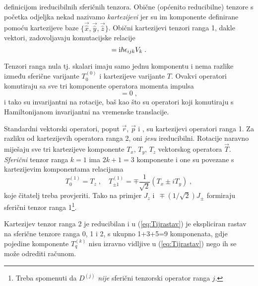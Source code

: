 definicijom ireducibilnih sferičnih tenzora. 
Obične (općenito reducibilne) tenzore s početka odjeljka nekad
nazivamo \emph{kartezijevi} jer su im komponente definirane pomoću kartezijeve
baze $\{\vec{\hat{x}}, \vec{\hat{y}}, \vec{\hat{z}}\}$.
Obični kartezijevi tenzori ranga 1, dakle vektori, zadovoljavaju komutacijske
relacije
\begin{equation}
 [J_i, V_j] = \rmi \hbar \epsilon_{ijk} V_k \;.
 \label{eq:jvkomutacija}
\end{equation}
\begin{primjer}
Tenzori ranga nula tj. skalari imaju samo jednu komponentu
i nema razlike između sferične varijante $T^{(0)}_0$ i kartezijeve varijante $T$.
Ovakvi operatori komutiraju sa sve tri komponente operatora momenta impulsa
\begin{equation}
    [J_i, T] = 0 \;,
\end{equation}
i tako su invarijantni na rotacije, baš kao što su operatori
koji komutiraju s Hamiltonijanom invarijantni na vremenske translacije.
\end{primjer}
\begin{primjer}
    Standardni vektorski operatori, poput $\vec{r}$, $\vec{p}$ i
    , su kartezijevi operatori ranga 1. Za razliku od
    kartezijevih operatora ranga 2, oni \emph{jesu} ireducibilni.
    Rotacije naravno miješaju sve tri kartezijeve komponente
    $T_x$, $T_y$, $T_z$ vektorskog operatora $\vec{T}$. 
    \emph{Sferični} tenzor ranga $k=1$ ima $2k+1=3$ komponente i
    one su povezane s kartezijevim komponentama relacijama
    \begin{equation}
    T^{(1)}_0 = T_z \;, \quad T^{(1)}_{\pm 1} = \mp \frac{1}{\sqrt{2}}
    (T_x \pm i T_y) \;,
    \label{eq:kartvektor}
    \end{equation}
    koje čitatelj treba provjeriti.
    Tako na primjer $J_z$ i $\,\mp (1/\sqrt{2})J_\pm$ formiraju sferični tenzor 
    ranga 1\footnote{Treba spomenuti da $D^{(j)}$ \emph{nije} 
    sferični tenzorski operator ranga $j$.}.
\end{primjer}
\begin{primjer}
    Kartezijev tenzor ranga 2 je reducibilan i u (\ref{eq:Tijrastav}) je ekspliciran
    rastav na sferične tenzore ranga 0, 1 i 2, s ukupno 1+3+5=9 komponenata,
    gdje pojedine komponente $T^{(k)}_q$ nisu izravno vidljive u (\ref{eq:Tijrastav}) 
    nego ih se može odrediti računom.
\end{primjer}


